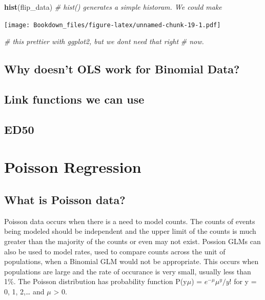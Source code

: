 \documentclass[
]{book}
\newenvironment{Shaded}{\begin{snugshade}}{\end{snugshade}}
\newcommand{\CommentTok}[1]{\textcolor[rgb]{0.56,0.35,0.01}{\textit{#1}}}
\newcommand{\KeywordTok}[1]{\textcolor[rgb]{0.13,0.29,0.53}{\textbf{#1}}}
\newcommand{\NormalTok}[1]{#1}
\begin{document}
\begin{Shaded}
\begin{Highlighting}[]
\KeywordTok{hist}\NormalTok{(flip\_data)         }\CommentTok{\# hist() generates a simple historam. We could make}
\end{Highlighting}
\end{Shaded}

\texttt{[image: Bookdown\_files/figure-latex/unnamed-chunk-19-1.pdf]}

\begin{Shaded}
\begin{Highlighting}[]
                        \CommentTok{\# this prettier with ggplot2, but we don\textquotesingle{}t need that right}
                        \CommentTok{\# now.}
\end{Highlighting}
\end{Shaded}

\hypertarget{why-doesnt-ols-work-for-binomial-data}{%
\section{Why doesn't OLS work for Binomial Data?}\label{why-doesnt-ols-work-for-binomial-data}}

\hypertarget{link-functions-we-can-use}{%
\section{Link functions we can use}\label{link-functions-we-can-use}}

\hypertarget{ed50}{%
\section{ED50}\label{ed50}}

\hypertarget{poisson-regression}{%
\chapter{Poisson Regression}\label{poisson-regression}}

\hypertarget{what-is-poisson-data}{%
\section{What is Poisson data?}\label{what-is-poisson-data}}

Poisson data occurs when there is a need to model counts. The counts of events being modeled should be independent and the upper limit of the counts is much greater than the majority of the counts or even may not exist. Possion GLMs can also be used to model rates, used to compare counts across the unit of populations, when a Binomial GLM would not be appropriate. This occurs when populations are large and the rate of occurance is very small, usually less than 1\%. The Poisson distribution has probability function P(y\textbar{}\(\mu\)) = \(e^{-\mu}\mu^y/y!\) for y = 0, 1, 2,\ldots{} and \(\mu\) \textgreater{} 0.
\end{document}
